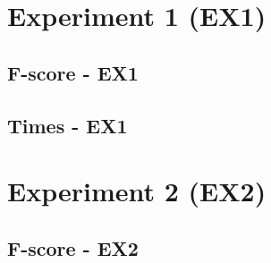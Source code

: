 \begin{apendicesenv}

\partapendices



\chapter{Experiment 1 (EX1)}

\section{F-score - EX1}

\begin{figure}[!htb]
    \centering
    
    \label{fig:ex1FScore}
\end{figure}

\newpage

\section{Times - EX1}

\begin{figure}[!htb]
    \centering
    
    \label{fig:ex1Times}
\end{figure}

\chapter{Experiment 2 (EX2)}

\section{F-score - EX2}


\end{apendicesenv}
